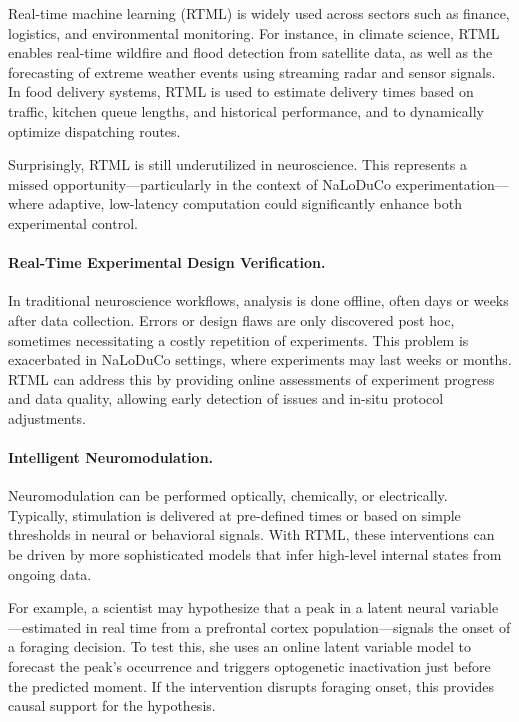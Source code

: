 
Real-time machine learning (RTML) is widely used across sectors such as finance, logistics, and environmental monitoring.
%
For instance, in climate science, RTML enables real-time wildfire and flood detection from satellite data, as well as the forecasting of extreme weather events using streaming radar and sensor signals.
%
In food delivery systems, RTML is used to estimate delivery times based on traffic, kitchen queue lengths, and historical performance, and to dynamically optimize dispatching routes.

Surprisingly, RTML is still underutilized in neuroscience.
%
This represents a missed opportunity—particularly in the context of NaLoDuCo experimentation—where adaptive, low-latency computation could significantly enhance both experimental control.

\paragraph{Real-Time Experimental Design Verification.}
In traditional neuroscience workflows, analysis is done offline, often days or weeks after data collection.
%
Errors or design flaws are only discovered post hoc, sometimes necessitating a costly repetition of experiments.
%
This problem is exacerbated in NaLoDuCo settings, where experiments may last weeks or months.
%
RTML can address this by providing online assessments of experiment progress and data quality, allowing early detection of issues and in-situ protocol adjustments.

\paragraph{Intelligent Neuromodulation.}
Neuromodulation can be performed optically, chemically, or electrically.
%
Typically, stimulation is delivered at pre-defined times or based on simple thresholds in neural or behavioral signals.
%
With RTML, these interventions can be driven by more sophisticated models that infer high-level internal states from ongoing data.

%
For example, a scientist may hypothesize that a peak in a latent neural variable—estimated in real time from a prefrontal cortex population—signals the onset of a foraging decision.
%
To test this, she uses an online latent variable model to forecast the peak's occurrence and triggers optogenetic inactivation just before the predicted moment.
%
If the intervention disrupts foraging onset, this provides causal support for the hypothesis.

